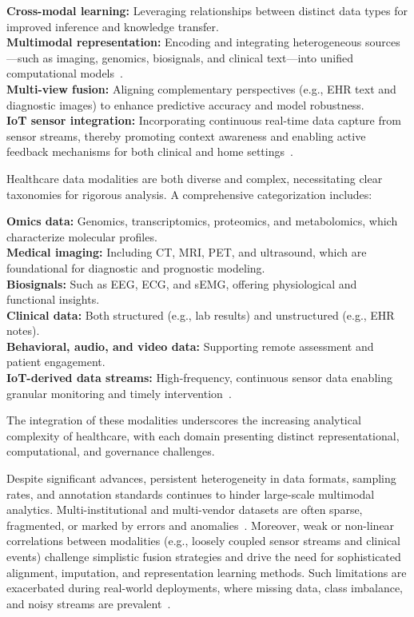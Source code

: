 \documentclass[sigconf]{acmart}
\begin{document}
\noindent\textbf{Cross-modal learning:} Leveraging relationships between distinct data types for improved inference and knowledge transfer.
\\
\textbf{Multimodal representation:} Encoding and integrating heterogeneous sources---such as imaging, genomics, biosignals, and clinical text---into unified computational models~\cite{ref16,ref17,ref18,ref25,ref28,ref29,ref30,ref67,ref68,ref70,ref90,ref106,ref107}.
\\
\textbf{Multi-view fusion:} Aligning complementary perspectives (e.g., EHR text and diagnostic images) to enhance predictive accuracy and model robustness.
\\
\textbf{IoT sensor integration:} Incorporating continuous real-time data capture from sensor streams, thereby promoting context awareness and enabling active feedback mechanisms for both clinical and home settings~\cite{ref90,ref106,ref107,ref68}.

Healthcare data modalities are both diverse and complex, necessitating clear taxonomies for rigorous analysis. A comprehensive categorization includes:

\noindent\textbf{Omics data:} Genomics, transcriptomics, proteomics, and metabolomics, which characterize molecular profiles.
\\
\textbf{Medical imaging:} Including CT, MRI, PET, and ultrasound, which are foundational for diagnostic and prognostic modeling.
\\
\textbf{Biosignals:} Such as EEG, ECG, and sEMG, offering physiological and functional insights.
\\
\textbf{Clinical data:} Both structured (e.g., lab results) and unstructured (e.g., EHR notes).
\\
\textbf{Behavioral, audio, and video data:} Supporting remote assessment and patient engagement.
\\
\textbf{IoT-derived data streams:} High-frequency, continuous sensor data enabling granular monitoring and timely intervention~\cite{ref35,ref42,ref46,ref50,ref54,ref55,ref61,ref62,ref64,ref65,ref89,ref90,ref106}.

The integration of these modalities underscores the increasing analytical complexity of healthcare, with each domain presenting distinct representational, computational, and governance challenges.

Despite significant advances, persistent heterogeneity in data formats, sampling rates, and annotation standards continues to hinder large-scale multimodal analytics. Multi-institutional and multi-vendor datasets are often sparse, fragmented, or marked by errors and anomalies~\cite{ref82,ref83,ref84,ref90,ref106}. Moreover, weak or non-linear correlations between modalities (e.g., loosely coupled sensor streams and clinical events) challenge simplistic fusion strategies and drive the need for sophisticated alignment, imputation, and representation learning methods. Such limitations are exacerbated during real-world deployments, where missing data, class imbalance, and noisy streams are prevalent~\cite{ref83,ref84,ref106}.
\end{document}
